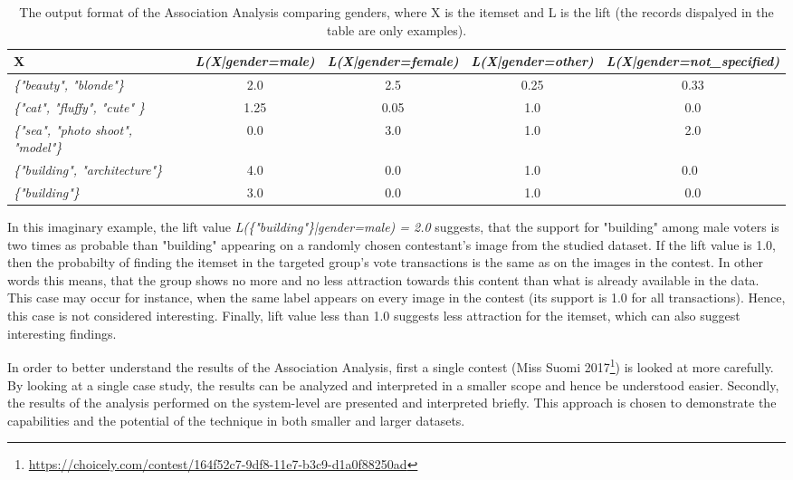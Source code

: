     \begin{table}[H]
        \centering
        \begin{adjustbox}{width=1\textwidth}
            \begin{tabular}{l|c|c|c|c}
                X & \emph{L(X|gender=male)} & \emph{L(X|gender=female)} & \emph{L(X|gender=other)} & \emph{L(X|gender=not\_specified)} \\
                \hline
                \emph{\{"beauty", "blonde"\}} & 2.0 & 2.5 & 0.25 & 0.33 \\
                \emph{\{"cat", "fluffy", "cute" \}} & 1.25 & 0.05 & 1.0 & 0.0 \\
                \emph{\{"sea", "photo shoot", "model"\}} & 0.0 & 3.0 & 1.0 & 2.0 \\
                \emph{\{"building", "architecture"\}} & 4.0 & 0.0 & 1.0 & 0.0 \\
                \emph{\{"building"\}} & 3.0 & 0.0 & 1.0 & 0.0
            \end{tabular}
        \end{adjustbox}
        \caption{The output format of the Association Analysis comparing genders, where X is the itemset and L is the lift (the records dispalyed in the table are only examples).}
        \label{itemset_lift_format}
    \end{table}

    In this imaginary example, the lift value \emph{L(\{"building"\}|gender=male) = 2.0} suggests, that the support for "building" among male voters is two times as probable than "building" appearing on a randomly chosen contestant's image from the studied dataset. If the lift value is 1.0, then the probabilty of finding the itemset in the targeted group's vote transactions is the same as on the images in the contest. In other words this means, that the group shows no more and no less attraction towards this content than what is already available in the data. This case may occur for instance, when the same label appears on every image in the contest (its support is 1.0 for all transactions). Hence, this case is not considered interesting. Finally, lift value less than 1.0 suggests less attraction for the itemset, which can also suggest interesting findings.

    In order to better understand the results of the Association Analysis, first a single contest (Miss Suomi 2017\footnote{\url{https://choicely.com/contest/164f52c7-9df8-11e7-b3c9-d1a0f88250ad}}) is looked at more carefully. By looking at a single case study, the results can be analyzed and interpreted in a smaller scope and hence be understood easier. Secondly, the results of the analysis performed on the system-level are presented and interpreted briefly. This approach is chosen to demonstrate the capabilities and the potential of the technique in both smaller and larger datasets.

